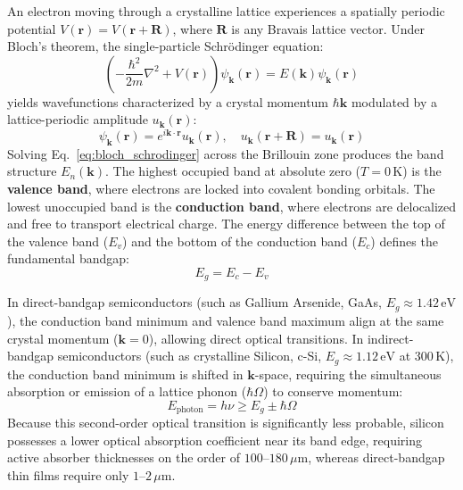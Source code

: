 An electron moving through a crystalline lattice experiences a spatially periodic potential $V(\mathbf{r}) = V(\mathbf{r} + \mathbf{R})$, where $\mathbf{R}$ is any Bravais lattice vector. Under Bloch's theorem, the single-particle Schr\"odinger equation:
\begin{equation}
\left( -\frac{\hbar^2}{2m} \nabla^2 + V(\mathbf{r}) \right) \psi_{\mathbf{k}}(\mathbf{r}) = E(\mathbf{k}) \psi_{\mathbf{k}}(\mathbf{r})
\label{eq:bloch_schrodinger}
\end{equation}
yields wavefunctions characterized by a crystal momentum $\hbar \mathbf{k}$ modulated by a lattice-periodic amplitude $u_{\mathbf{k}}(\mathbf{r})$:
\begin{equation}
\psi_{\mathbf{k}}(\mathbf{r}) = e^{i \mathbf{k} \cdot \mathbf{r}} u_{\mathbf{k}}(\mathbf{r}), \quad u_{\mathbf{k}}(\mathbf{r} + \mathbf{R}) = u_{\mathbf{k}}(\mathbf{r})
\label{eq:bloch_wave}
\end{equation}
Solving Eq.~\eqref{eq:bloch_schrodinger} across the Brillouin zone produces the band structure $E_n(\mathbf{k})$. The highest occupied band at absolute zero ($T = 0\,\mathrm{K}$) is the \textbf{valence band}, where electrons are locked into covalent bonding orbitals. The lowest unoccupied band is the \textbf{conduction band}, where electrons are delocalized and free to transport electrical charge. The energy difference between the top of the valence band ($E_v$) and the bottom of the conduction band ($E_c$) defines the fundamental bandgap:
\begin{equation}
E_g = E_c - E_v
\label{eq:bandgap_def}
\end{equation}

In direct-bandgap semiconductors (such as Gallium Arsenide, GaAs, $E_g \approx 1.42\,\mathrm{eV}$), the conduction band minimum and valence band maximum align at the same crystal momentum ($\mathbf{k} = 0$), allowing direct optical transitions. In indirect-bandgap semiconductors (such as crystalline Silicon, c-Si, $E_g \approx 1.12\,\mathrm{eV}$ at $300\,\mathrm{K}$), the conduction band minimum is shifted in $\mathbf{k}$-space, requiring the simultaneous absorption or emission of a lattice phonon ($\hbar \Omega$) to conserve momentum:
\begin{equation}
E_{\mathrm{photon}} = h\nu \ge E_g \pm \hbar \Omega
\label{eq:indirect_absorption}
\end{equation}
Because this second-order optical transition is significantly less probable, silicon possesses a lower optical absorption coefficient near its band edge, requiring active absorber thicknesses on the order of $100$--$180\,\mu\mathrm{m}$, whereas direct-bandgap thin films require only $1$--$2\,\mu\mathrm{m}$.

